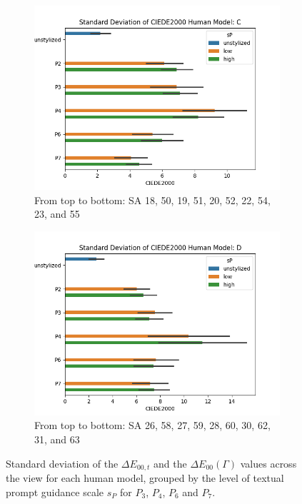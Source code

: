 \begin{figure}[ht]
\begin{subfigure}{0.49\textwidth}
		\includegraphics[width=\linewidth]{Figures/results/good/sd_ciede2000_irene.png}
		\caption{From top to bottom: SA 18, 50, 19, 51, 20, 52, 22, 54, 23, and 55}
	\end{subfigure}
	\begin{subfigure}{0.49\textwidth}
		\includegraphics[width=\linewidth]{Figures/results/good/sd_ciede2000_simon.png}
		\caption{From top to bottom: SA 26, 58, 27, 59, 28, 60, 30, 62, 31, and 63}
	\end{subfigure}
	\caption{Standard deviation of the $\Delta E_{00,t}$ and the $\Delta E_{00}(\varGamma)$ values across the view for each human model, grouped by the level of textual prompt guidance scale $s_P$ for $P_3$, $P_4$, $P_6$ and $P_7$.}
	\label{fig:sd_quantitative_distribution_ciede2000_good}
\end{figure}

